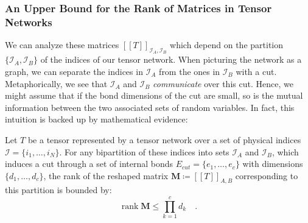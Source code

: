 \documentclass[../../main.tex]{subfiles}
\begin{document}
    

    \subsubsection{An Upper Bound for the Rank of Matrices in Tensor Networks}
    We can analyze these matrices $[[T]]_{\mathcal{I}_A, \mathcal{I}_B}$ which depend on the partition $\{\mathcal{I}_A, \mathcal{I}_B\}$ of the indices of our tensor network. When picturing the network as a graph, we can separate the indices in $\mathcal{I}_A$ from the ones in $\mathcal{I}_B$ with a cut. Metaphorically, we see that $\mathcal{I}_A$ and $\mathcal{I}_B$ \emph{communicate} over this cut. Hence, we might assume that if the bond dimensions of the cut are small, so is the mutual information between the two associated sets of random variables. In fact, this intuition is backed up by mathematical evidence:

    \begin{theorem}
    \label{theorem:min_cut_caps_rank}
Let $T$ be a tensor represented by a tensor network over a set of physical indices $\mathcal{I} = \{i_1, \dots, i_N\}$. For any bipartition of these indices into sets $\mathcal{I}_A$ and $\mathcal{I}_B$, which induces a cut through a set of internal bonds $E_{cut} = \{e_1, \dots, e_c\}$ with dimensions $\{d_1, \dots, d_c\}$, the rank of the reshaped matrix $\bm{M} \coloneqq [[T]]_{A,B}$ corresponding to this partition is bounded by:
$$
\operatorname{rank} \bm{M} \leq \prod_{k=1}^{c} d_k \quad .
$$
\end{theorem}
\end{document}
